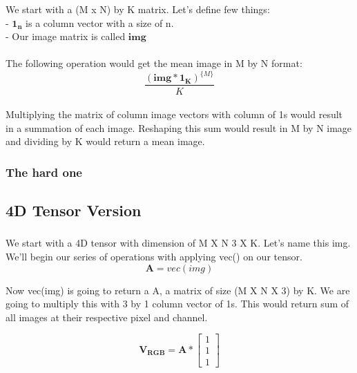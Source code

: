 \documentclass{article}
\newcommand{\matr}[1]{\mathbf{#1}}
\begin{document}
		We start with a (M x N) by K matrix. Let's define few things:\\
		- $\matr{1_{n}}$ is a column vector with a size of n.\\
		- Our image matrix is called $\matr{img}$\\
		\\
		The following operation would get the mean image in M by N format:\\	
		\begin{equation*}
		\frac{(\matr{img}*\matr{1_{K}})^{\{M\}}}{K}
		\end{equation*}
		\\
		Multiplying the matrix of column image vectors with column of 1s would result in a summation of each image.
		Reshaping this sum would result in M by N image and dividing by K would return a mean image.
		\\

		\subsubsection{The hard one} %
		
	\subsection{4D Tensor Version} %
		\subsubsection{} %
		We start with a 4D tensor with dimension of M X N 3 X K. Let's name this img. 
		We'll begin our series of operations with applying vec() on our tensor.\\

		\begin{equation*}
		\matr{A} = vec(img)
		\end{equation*}

		Now vec(img) is going to return a A, a matrix of size (M X N X 3) by K. We are going to multiply this with 3 by 1 column vector of 1s. 
		This would return sum of all images at their respective pixel and channel.

		\begin{equation*}
		\matr{V_{RGB}} = \matr{A} * 
						\begin{bmatrix} 
						1 \\ 1 \\ 1  
						\end{bmatrix} 
		\end{equation*}	
		
\end{document}
